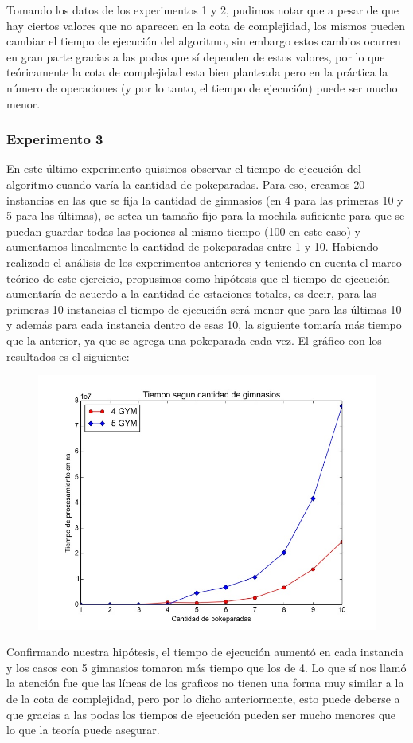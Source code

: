       Tomando los datos de los experimentos 1 y 2, pudimos notar que a pesar de que hay ciertos valores que no aparecen en la cota de complejidad, los mismos pueden cambiar el tiempo de ejecución del algoritmo, sin embargo estos cambios ocurren en gran parte gracias a las podas que sí dependen de estos valores, por lo que teóricamente la cota de complejidad esta bien planteada pero en la práctica la número de operaciones (y por lo tanto, el tiempo de ejecución) puede ser mucho menor.

    \subsubsection{Experimento 3}

      En este último experimento quisimos observar el tiempo de ejecución del algoritmo cuando varía la cantidad de pokeparadas. Para eso, creamos 20 instancias en las que se fija la cantidad de gimnasios (en 4 para las primeras 10 y 5 para las últimas), se setea un tamaño fijo para la mochila suficiente para que se puedan guardar todas las pociones al mismo tiempo  (100 en este caso) y aumentamos linealmente la cantidad de pokeparadas entre 1 y 10.
      Habiendo realizado el análisis de los experimentos anteriores y teniendo en cuenta el marco teórico de este ejercicio, propusimos como hipótesis que el tiempo de ejecución aumentaría de acuerdo a la cantidad de estaciones totales, es decir, para las primeras 10 instancias el tiempo de ejecución será menor que para las últimas 10 y además para cada instancia dentro de esas 10, la siguiente tomaría más tiempo que la anterior, ya que se agrega una pokeparada cada vez.
      El gráfico con los resultados es el siguiente:

\begin{figure}[H]
    \begin{center}
      \includegraphics[width=0.7\columnwidth]{imagenes/exp4_ej1.jpeg}
      \caption{}
    \end{center}
\end{figure}

      Confirmando nuestra hipótesis, el tiempo de ejecución aumentó en cada instancia y los casos con 5 gimnasios tomaron más tiempo que los de 4. 
      Lo que sí nos llamó la atención fue que las líneas de los graficos no tienen una forma muy similar a la de la cota de complejidad, pero por lo dicho anteriormente, esto puede deberse a que gracias a las podas los tiempos de ejecución pueden ser mucho menores que lo que la teoría puede asegurar.
